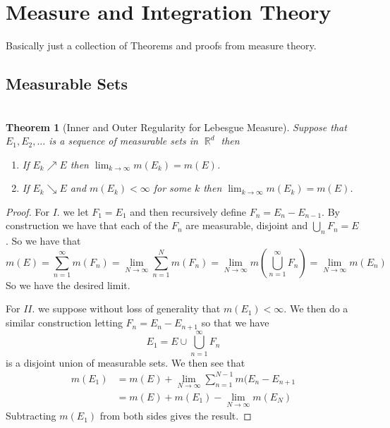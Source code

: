 \documentclass{article}
\DeclareMathOperator{\R}{\mathbb{R}}
\newtheorem*{thm}{\\ Theorem}
\begin{document}
\section{Measure and Integration Theory}
Basically just a collection of Theorems and proofs from measure theory.

\subsection{Measurable Sets}
\begin{thm}[Inner and Outer Regularity for Lebesgue Measure]
  Suppose that $E_1, E_2,\ldots$ is a sequence of measurable sets in $\R^d$
  then
  \begin{enumerate}
  \item[I.] If $E_k \nearrow E$ then $\lim_{k\to \infty} m(E_k) = m(E)$.
  \item[I.] If $E_k \searrow E$ and $m(E_k) < \infty$ for some $k$ then
    $\lim_{k\to \infty} m(E_k) = m(E)$.
  \end{enumerate}
\end{thm}
\begin{proof}
  For $I.$ we let $F_1 = E_1$ and then recursively define $F_n = E_n - E_{n-1}
  $. By construction we have that each of the $F_n$ are measurable, disjoint
  and $\bigcup_{n}F_n = E$. So we have that
  \[
  m(E) = \sum_{n=1}^\infty m(F_n) = \lim_{N\to\infty}\sum_{n=1}^N m(F_n) =
  \lim_{N\to\infty} m\left(\bigcup_{n=1}^\infty F_n\right) = \lim_{N\to\infty}
  m(E_n)
  \]
  So we have the desired limit.

  For $II.$ we suppose without loss of generality that $m(E_1) < \infty$. We
  then do a similar construction letting $F_n = E_n - E_{n+1}$ so that we
  have
  \[
  E_1 = E \cup \bigcup_{n=1}^\infty F_n
  \]
  is a disjoint union of measurable sets. We then see that
  \begin{align*}
    m(E_1) &= m(E) + \lim_{N\to\infty}\sum_{n=1}^{N-1}m(E_n - E_{n+1} \\
    &= m(E) + m(E_1) - \lim_{N\to\infty} m(E_N)
  \end{align*}
  Subtracting $m(E_1)$ from both sides gives the result. 
\end{proof}
\end{document}
